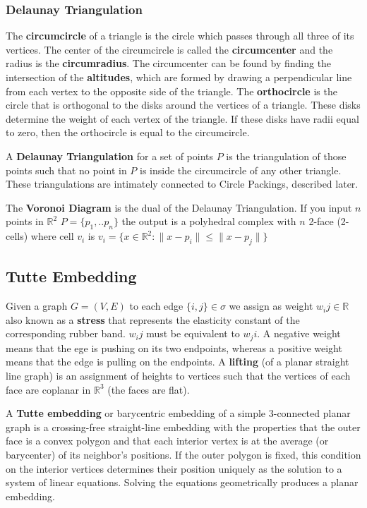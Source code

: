 \documentclass{article}
\newcommand{\R}{\mathbb{R}}
\begin{document}
  \subsubsection{Delaunay Triangulation}
  The \textbf{circumcircle} of a triangle is the circle which passes through all three of its vertices. The center of the circumcircle is called the \textbf{circumcenter} and the radius is the \textbf{circumradius}. The circumcenter can be found by finding the intersection of the \textbf{altitudes}, which are formed by drawing a perpendicular line from each vertex to the opposite side of the triangle. The \textbf{orthocircle} is the circle that is orthogonal to the disks around the vertices of a triangle. These disks determine the weight of each vertex of the triangle. If these disks have radii equal to zero, then the orthocircle is equal to the circumcircle.
  
  A \textbf{Delaunay Triangulation} for a set of points $P$ is the triangulation of those points such that no point in $P$ is inside the circumcircle of any other triangle. These triangulations are intimately connected to Circle Packings, described later.
  
  The \textbf{Voronoi Diagram} is the dual of the Delaunay Triangulation. If you input $n$ points in $\R^2$ $P=\{p_1,..p_n\}$ the output is a polyhedral complex with $n$ 2-face (2-cells) where cell $v_i$ is $v_i = \{x \in \R^2 : \| x - p_i \| \leq \| x - p_j\|\}$
 
 \subsection{Tutte Embedding}
   Given a graph $G=(V,E)$ to each edge $\{i,j\}\in\sigma$ we assign as weight $w_ij\in\R$ also known as a \textbf{stress} that represents the elasticity constant of the corresponding rubber band. $w_ij$ must be equivalent to $w_ji$. A negative weight means that the ege is pushing on its two endpoints, whereas a positive weight means that the edge is pulling on the endpoints. 
 A \textbf{lifting} (of a planar straight line graph) is an assignment of heights to vertices such that the vertices of each face are coplanar in $\R^3$ (the faces are flat).
  
  A \textbf{Tutte embedding} or barycentric embedding of a simple 3-connected planar graph is a crossing-free straight-line embedding with the properties that the outer face is a convex polygon and that each interior vertex is at the average (or barycenter) of its neighbor's positions. If the outer polygon is fixed, this condition on the interior vertices determines their position uniquely as the solution to a system of linear equations. Solving the equations geometrically produces a planar embedding. 
  
\end{document}
